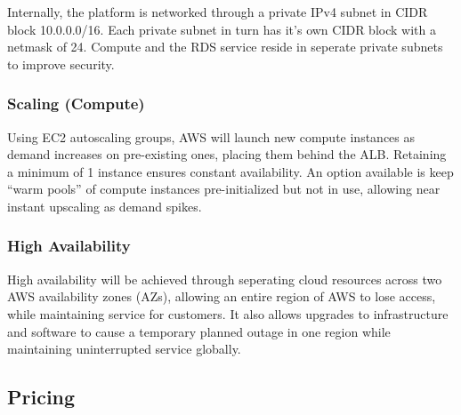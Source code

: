 Internally, the platform is networked through a private IPv4 subnet in CIDR block 10.0.0.0/16. Each private subnet in turn has it's own CIDR block with a netmask of 24. Compute and the RDS service reside in seperate private subnets to improve security.

\subsubsection*{Scaling (Compute)}

Using EC2 autoscaling groups, AWS will launch new compute instances as demand increases on pre-existing ones, placing them behind the ALB. Retaining a minimum of 1 instance ensures constant availability. An option available is keep ``warm pools'' of compute instances pre-initialized but not in use, allowing near instant upscaling as demand spikes.

\subsubsection*{High Availability}

High availability will be achieved through seperating cloud resources across two AWS availability zones (AZs), allowing an entire region of AWS to lose access, while maintaining service for customers. It also allows upgrades to infrastructure and software to cause a temporary planned outage in one region while maintaining uninterrupted service globally.

\subsection{Pricing}

